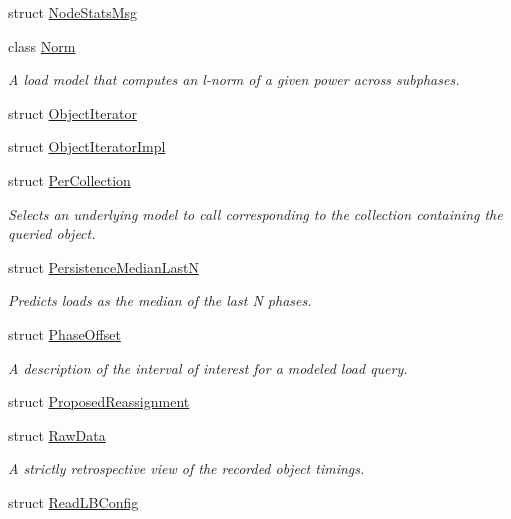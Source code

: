 \begin{DoxyCompactItemize}
struct \hyperlink{structvt_1_1vrt_1_1collection_1_1balance_1_1_node_stats_msg}{Node\+Stats\+Msg}
\item 
class \hyperlink{classvt_1_1vrt_1_1collection_1_1balance_1_1_norm}{Norm}
\begin{DoxyCompactList}\small\item\em A load model that computes an l-\/norm of a given power across subphases. \end{DoxyCompactList}\item 
struct \hyperlink{structvt_1_1vrt_1_1collection_1_1balance_1_1_object_iterator}{Object\+Iterator}
\item 
struct \hyperlink{structvt_1_1vrt_1_1collection_1_1balance_1_1_object_iterator_impl}{Object\+Iterator\+Impl}
\item 
struct \hyperlink{structvt_1_1vrt_1_1collection_1_1balance_1_1_per_collection}{Per\+Collection}
\begin{DoxyCompactList}\small\item\em Selects an underlying model to call corresponding to the collection containing the queried object. \end{DoxyCompactList}\item 
struct \hyperlink{structvt_1_1vrt_1_1collection_1_1balance_1_1_persistence_median_last_n}{Persistence\+Median\+LastN}
\begin{DoxyCompactList}\small\item\em Predicts loads as the median of the last N phases. \end{DoxyCompactList}\item 
struct \hyperlink{structvt_1_1vrt_1_1collection_1_1balance_1_1_phase_offset}{Phase\+Offset}
\begin{DoxyCompactList}\small\item\em A description of the interval of interest for a modeled load query. \end{DoxyCompactList}\item 
struct \hyperlink{structvt_1_1vrt_1_1collection_1_1balance_1_1_proposed_reassignment}{Proposed\+Reassignment}
\item 
struct \hyperlink{structvt_1_1vrt_1_1collection_1_1balance_1_1_raw_data}{Raw\+Data}
\begin{DoxyCompactList}\small\item\em A strictly retrospective view of the recorded object timings. \end{DoxyCompactList}\item 
struct \hyperlink{structvt_1_1vrt_1_1collection_1_1balance_1_1_read_l_b_config}{Read\+L\+B\+Config}

\end{DoxyCompactItemize}
